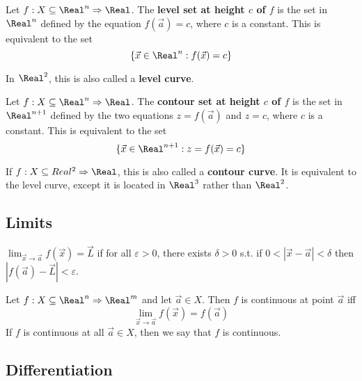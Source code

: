 \begin{definition}
  Let $f : X \subseteq \Real^n \Rightarrow \Real$. The \textbf{level set at height $c$ of $f$} is the set in $\Real^n$ defined by the equation $f(\vec{a}) = c$, where $c$ is a constant. This is equivalent to the set
  \[
    \{ \vec{x} \in \Real^n : f(\vec{x}) = c \}
  \]

  In $\Real^2$, this is also called a \textbf{level curve}.
\end{definition}

\begin{definition}
  Let $f : X \subseteq \Real^n \Rightarrow \Real$. The \textbf{contour set at height $c$ of $f$} is the set in $\Real^{n + 1}$ defined by the two equations $z = f(\vec{a})$ and $z = c$, where $c$ is a constant. This is equivalent to the set
  \[
    \{ \vec{x} \in \Real^{n + 1} : z = f(\vec{x}) = c \}
  \]

  If $f : X \subseteq Real^2 \Rightarrow \Real$, this is also called a \textbf{contour curve}. It is equivalent to the level curve, except it is located in $\Real^3$ rather than $\Real^2$.
\end{definition}


\subsection{Limits}


\begin{definition}[Limit]
  $\lim_{\vec{x} \to \vec{a}} f(\vec{x}) = \vec{L}$ if for all $\varepsilon > 0$, there exists $\delta > 0$ s.t. if $0 < |\vec{x} - \vec{a}| < \delta$ then $|f(\vec{a}) - \vec{L}| < \varepsilon$.
\end{definition}

\begin{definition}[Continuity]
  Let $f : X \subseteq \Real^n \Rightarrow \Real^m$ and let $\vec{a} \in X$. Then $f$ is continuous at point $\vec{a}$ iff
  \[
    \lim_{\vec{x} \to \vec{a}} f(\vec{x}) = f(\vec{a})
  \]
  If $f$ is continuous at all $\vec{a} \in X$, then we say that $f$ is continuous.
\end{definition}

\subsection{Differentiation}

